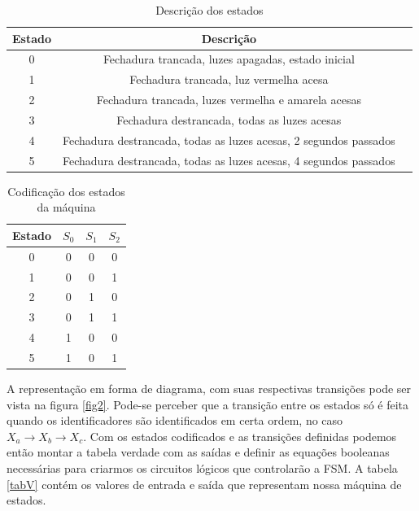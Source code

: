 \documentclass[12pt,a4paper]{article}
\begin{document}
\begin{table}[hb]
\begin{center}
\begin{tabular}{c|c|c}
\textbf{Estado} & \textbf{Descrição}\\ \hline
0 & Fechadura trancada, luzes apagadas, estado inicial \\
1 & Fechadura trancada, luz vermelha acesa \\
2 & Fechadura trancada, luzes vermelha e amarela acesas \\
3 & Fechadura destrancada, todas as luzes acesas \\
4 & Fechadura destrancada, todas as luzes acesas, 2 segundos passados \\
5 & Fechadura destrancada, todas as luzes acesas, 4 segundos passados \\ 
\hline
\end{tabular}
\end{center}
\caption{Descrição dos estados}
\label{tab2}
\end{table}


\begin{table}[!hb]
\begin{center}
\begin{tabular}{c|ccc}
Estado & $S_0$ & $S_1$ & $S_2$ \\ \hline
0 & 0 & 0 & 0 \\
1 & 0 & 0 & 1 \\
2 & 0 & 1 & 0 \\
3 & 0 & 1 & 1 \\
4 & 1 & 0 & 0 \\
5 & 1 & 0 & 1 \\
\end{tabular}
\end{center}
\caption{Codificação dos estados da máquina}
\label{tab3}
\end{table}

A representação em forma de diagrama, com suas respectivas transições pode ser vista na figura \ref{fig2}. Pode-se perceber que a transição entre os estados só é feita quando os identificadores são identificados em certa ordem, no caso $X_a \rightarrow X_b \rightarrow X_c$. Com os estados codificados e as transições definidas podemos então montar a tabela verdade com as saídas e definir as equações booleanas necessárias para criarmos os circuitos lógicos que controlarão a FSM. A tabela \ref{tabV} contém os valores de entrada e saída que representam nossa máquina de estados.
\end{document}
